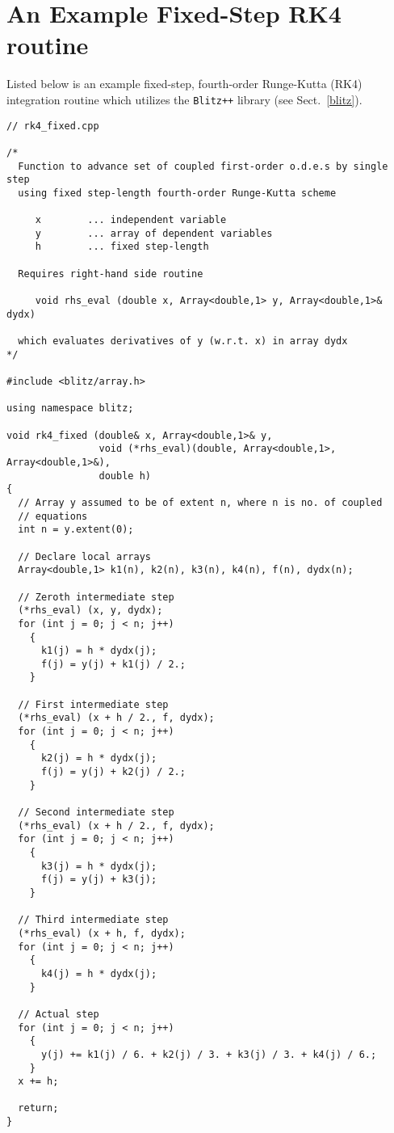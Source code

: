 \section{An Example Fixed-Step RK4 routine}
Listed below is an example fixed-step, fourth-order Runge-Kutta (RK4) integration
routine which utilizes the {\tt Blitz++} library (see Sect.~\ref{blitz}).
{\small\begin{verbatim}
// rk4_fixed.cpp 

/*
  Function to advance set of coupled first-order o.d.e.s by single step
  using fixed step-length fourth-order Runge-Kutta scheme

     x        ... independent variable
     y        ... array of dependent variables 
     h        ... fixed step-length

  Requires right-hand side routine
  
     void rhs_eval (double x, Array<double,1> y, Array<double,1>& dydx)
	
  which evaluates derivatives of y (w.r.t. x) in array dydx
*/

#include <blitz/array.h>

using namespace blitz;

void rk4_fixed (double& x, Array<double,1>& y, 
                void (*rhs_eval)(double, Array<double,1>, Array<double,1>&), 
                double h)
{
  // Array y assumed to be of extent n, where n is no. of coupled
  // equations
  int n = y.extent(0);

  // Declare local arrays
  Array<double,1> k1(n), k2(n), k3(n), k4(n), f(n), dydx(n);

  // Zeroth intermediate step 
  (*rhs_eval) (x, y, dydx);
  for (int j = 0; j < n; j++)
    {
      k1(j) = h * dydx(j);
      f(j) = y(j) + k1(j) / 2.;
    }

  // First intermediate step 
  (*rhs_eval) (x + h / 2., f, dydx);
  for (int j = 0; j < n; j++)
    {
      k2(j) = h * dydx(j);
      f(j) = y(j) + k2(j) / 2.;
    }

  // Second intermediate step
  (*rhs_eval) (x + h / 2., f, dydx);
  for (int j = 0; j < n; j++)
    {
      k3(j) = h * dydx(j);
      f(j) = y(j) + k3(j);
    }

  // Third intermediate step 
  (*rhs_eval) (x + h, f, dydx);
  for (int j = 0; j < n; j++)
    {
      k4(j) = h * dydx(j);
    }

  // Actual step 
  for (int j = 0; j < n; j++)
    {
      y(j) += k1(j) / 6. + k2(j) / 3. + k3(j) / 3. + k4(j) / 6.;
    }
  x += h;

  return;
}
\end{verbatim}}

